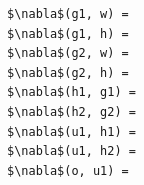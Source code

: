 \documentclass[border=10pt]{standalone}
\begin{document}
\begin{lstlisting}
$\nabla$(g1, w) =                    
$\nabla$(g1, h) =
$\nabla$(g2, w) =                    
$\nabla$(g2, h) =
$\nabla$(h1, g1) =
$\nabla$(h2, g2) =
$\nabla$(u1, h1) =              
$\nabla$(u1, h2) =
$\nabla$(o, u1) =
\end{lstlisting}
\end{document}

